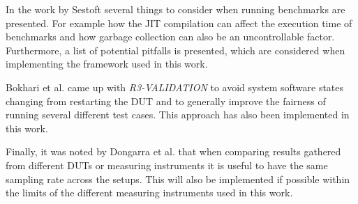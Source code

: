 In the work by Sestoft\cite*{sestoft2013microbenchmarks} several things to consider when running benchmarks are presented. For example how the JIT compilation can affect the execution time of benchmarks and how garbage collection can also be an uncontrollable factor. Furthermore, a list of potential pitfalls is presented, which are considered when implementing the framework used in this work. 

Bokhari et al.\cite*{Bokhari2020r3} came up with \textit{R3-VALIDATION} to avoid system software states changing from restarting the DUT and to generally improve the fairness of running several different test cases. This approach has also been implemented in this work.

Finally, it was noted by Dongarra et al.\cite*{Dongarra2012} that when comparing results gathered from different DUTs or measuring instruments it is useful to have the same sampling rate across the setups. This will also be implemented if possible within the limits of the different measuring instruments used in this work.


